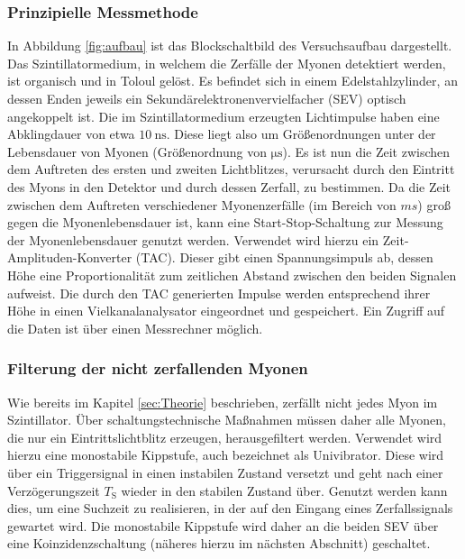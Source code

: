 \subsubsection{Prinzipielle Messmethode}
In Abbildung \ref{fig:aufbau} ist das Blockschaltbild des Versuchsaufbau dargestellt.
Das Szintillatormedium, in welchem die Zerfälle der Myonen detektiert werden, ist organisch und in Toloul gelöst. Es befindet sich in einem Edelstahlzylinder, an dessen Enden jeweils ein Sekundärelektronenvervielfacher (SEV) optisch angekoppelt ist.
Die im Szintillatormedium erzeugten Lichtimpulse haben eine Abklingdauer von etwa $\SI{10}{\nano\second}$. Diese liegt also um Größenordnungen unter der Lebensdauer von Myonen (Größenordnung von $\si{\micro\second}$).
Es ist nun die Zeit zwischen dem Auftreten des ersten und zweiten Lichtblitzes, verursacht durch den Eintritt des Myons in den Detektor und durch dessen Zerfall, zu bestimmen.
Da die Zeit zwischen dem Auftreten verschiedener Myonenzerfälle (im Bereich von $\si{ms}$) groß gegen die Myonenlebensdauer ist, kann eine Start-Stop-Schaltung zur Messung der Myonenlebensdauer genutzt werden.
Verwendet wird hierzu ein Zeit-Amplituden-Konverter (TAC). Dieser gibt einen Spannungsimpuls ab, dessen Höhe eine Proportionalität zum zeitlichen Abstand zwischen den beiden Signalen aufweist.
Die durch den TAC generierten Impulse werden entsprechend ihrer Höhe in einen Vielkanalanalysator eingeordnet und gespeichert. Ein Zugriff auf die Daten ist über einen Messrechner möglich.

\subsubsection{Filterung der nicht zerfallenden Myonen}
Wie bereits im Kapitel \ref{sec:Theorie} beschrieben, zerfällt nicht jedes Myon im Szintillator. Über schaltungstechnische Maßnahmen müssen daher alle Myonen, die nur ein Eintrittslichtblitz erzeugen, herausgefiltert werden.
Verwendet wird hierzu eine monostabile Kippstufe, auch bezeichnet als Univibrator. Diese wird über ein Triggersignal in einen instabilen Zustand versetzt und geht nach einer Verzögerungszeit $T_{\mathrm{S}}$ wieder in den stabilen Zustand über.
Genutzt werden kann dies, um eine Suchzeit zu realisieren, in der auf den Eingang eines Zerfallssignals gewartet wird.
Die monostabile Kippstufe wird daher an die beiden SEV über eine Koinzidenzschaltung (näheres hierzu im nächsten Abschnitt) geschaltet.


